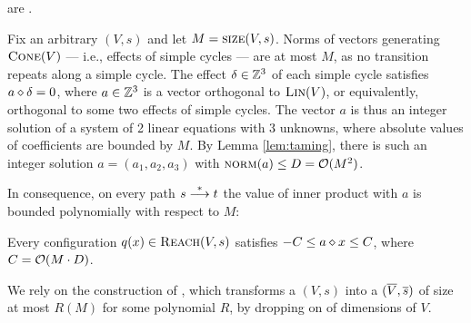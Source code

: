 \begin{lemma} \label{lem:geom-sandwich}
\Geomvass are \sandwich.
\end{lemma}
%
\begin{appendixproof}
Fix an arbitrary \geomvass $(V, s)$ and let $M = \textsc{size}(V,s)$.
Norms of vectors generating $\textsc{Cone}(V)$ --- i.e., effects of simple cycles --- are at most $M$, 
as no transition repeats along a simple cycle.
The effect $\delta \in \mathbb{Z}^3$  of each simple cycle
satisfies $a \diamond \delta = 0$, where $a\in\mathbb{Z}^3$ is a vector orthogonal to $\textsc{Lin}(V)$,
or equivalently, orthogonal to some two effects of simple cycles.
The vector $a$ is thus an integer solution of a system of 2 linear equations with 3 unknowns,
where absolute values of coefficients are bounded by $M$.
By Lemma \ref{lem:taming}, there is such an integer solution 
$a=(a_1, a_2, a_3)$ with $\textsc{norm}(a)\leq D={\cal O}(M^2)$.


In consequence, on every path $s \stackrel{*}{\longrightarrow} t$ the value of inner product with $a$ is bounded polynomially
with respect to $M$:
%
\begin{claim} \label{claim:axx}
Every configuration $q(x)\in \textsc{Reach}(V,s)$  satisfies
$-C \leq a \diamond x \leq C$, where $C = {\cal O}(M\cdot D)$. 
\end{claim}
%

We rely on the construction of \cite[Lemma 5.1]{Zhang-geom}, which transforms a 
\geomvass $(V,s )$ into a \dvass $(\overline{V}, \overline{s})$ of size at most $R(M)$
for some polynomial $R$, by dropping on of dimensions of $V$.


\end{appendixproof}
